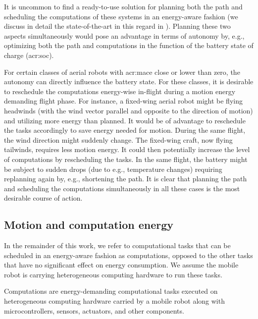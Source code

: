 It is uncommon to find a ready-to-use solution for planning both the path and scheduling the computations of these systems in an energy-aware fashion (we discuss in detail the state-of-the-art in this regard in ). Planning these two aspects simultaneously would pose an advantage in terms of autonomy by, e.g., optimizing both the path and computations in the function of the battery state of charge (\Gls{acr:soc}). 

For certain classes of aerial robots with \Gls{acr:mace} close or lower than zero, the autonomy can directly influence the battery state. For these classes, it is desirable to reschedule the computations energy-wise in-flight during a motion energy demanding flight phase. For instance, a fixed-wing aerial robot might be flying headwinds (with the wind vector parallel and opposite to the direction of motion) and utilizing more energy than planned. It would be of advantage to reschedule the tasks accordingly to save energy needed for motion. During the same flight, the wind direction might suddenly change. The fixed-wing craft, now flying tailwinds, requires less motion energy. It could then potentially increase the level of computations by rescheduling the tasks. In the same flight, the battery might be subject to sudden drops (due to e.g., temperature changes) requiring replanning again by, e.g., shortening the path. It is clear that planning the path and scheduling the computations simultaneously in all these cases is the most desirable course of action.

\subsection{Motion and computation energy}

In the remainder of this work, we refer to computational tasks that can be scheduled in an energy-aware fashion as computations, opposed to the other tasks that have no significant effect on energy consumption. We assume the mobile robot is carrying heterogeneous computing hardware to run these tasks.

\begin{highlight}
  \begin{defn}[Computations]\label{def:comps}
    Computations are energy-demanding computational tasks executed on heterogeneous computing hardware carried by a mobile robot along with microcontrollers, sensors, actuators, and other components.
  \end{defn}
\end{highlight}

